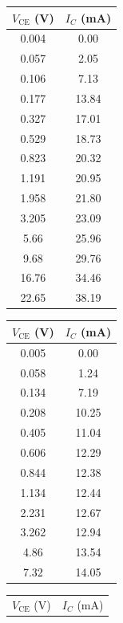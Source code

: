 \documentclass[%
sor,
 jor,
 amsmath,amssymb,
 reprint,
]{revtex4-2}
\begin{document}
\begin{center}
\begin{minipage}{0.31\linewidth}
\centering
{}
\begin{tabular}{|c|c|}
\hline
$V_\text{CE}$ (V) & $I_C$ (mA) \\
\hline
0.004  & 0.00 \\
0.057  & 2.05 \\
0.106  & 7.13 \\
0.177  & 13.84 \\
0.327  & 17.01 \\
0.529  & 18.73 \\
0.823  & 20.32 \\
1.191  & 20.95 \\
1.958  & 21.80 \\
3.205  & 23.09 \\
5.66  & 25.96 \\
9.68 & 29.76 \\
16.76 & 34.46 \\
22.65 & 38.19 \\
\hline
\end{tabular}
\end{minipage}
\hfill
\begin{minipage}{0.3\linewidth}
\centering
\begin{tabular}{|c|c|}
\hline
$V_\text{CE}$ (V) & $I_C$ (mA) \\
\hline
0.005 & 0.00 \\
0.058 & 1.24 \\
0.134 & 7.19 \\
0.208 & 10.25 \\
0.405 & 11.04 \\
0.606 & 12.29 \\
0.844 & 12.38 \\
1.134 & 12.44 \\
2.231 & 12.67 \\
3.262 & 12.94 \\
4.86 & 13.54 \\
7.32 & 14.05 \\
\hline
\end{tabular}
\end{minipage}
\hfill
\begin{minipage}{0.31\linewidth}
\centering
{}
\begin{tabular}{|c|c|}
\hline
$V_\text{CE}$ (V) & $I_C$ (mA) \\

\end{tabular}
\end{minipage}
\end{center}
\end{document}
